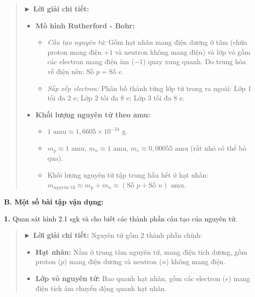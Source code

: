 \documentclass[11pt,a4paper]{article}
\begin{document}
\begin{quote}\small
{\color{myBlue}\textbf{► Lời giải chi tiết:}}
\begin{itemize}[leftmargin=*,itemsep=1pt,topsep=1pt]
  \item \textbf{Mô hình Rutherford - Bohr:}
    \begin{itemize}
      \item \textit{Cấu tạo nguyên tử:} Gồm hạt nhân mang điện dương ở tâm (chứa proton mang điện $+1$ và neutron không mang điện) và lớp vỏ gồm các electron mang điện âm ($-1$) quay xung quanh. Do trung hòa về điện nên: $\text{Số } p = \text{Số } e$.
      \item \textit{Sắp xếp electron:} Phân bố thành từng lớp từ trong ra ngoài: Lớp 1 tối đa $2\text{ e}$; Lớp 2 tối đa $8\text{ e}$; Lớp 3 tối đa $8\text{ e}$.
    \end{itemize}
  \item \textbf{Khối lượng nguyên tử theo amu:}
    \begin{itemize}
      \item $1\text{ amu} \approx 1{,}6605 \times 10^{-24}\text{ g}$.
      \item $m_p \approx 1\text{ amu}$, $m_n \approx 1\text{ amu}$, $m_e \approx 0{,}00055\text{ amu}$ (rất nhỏ có thể bỏ qua).
      \item Khối lượng nguyên tử tập trung hầu hết ở hạt nhân: $m_{\text{nguyên tử}} \approx m_p + m_n \approx (\text{Số } p + \text{Số } n)\text{ amu}$.
    \end{itemize}
\end{itemize}
\end{quote}

\vspace{4pt}
{\color{mySub}\textbf{B. Một số bài tập vận dụng:}}

\textbf{1.} Quan sát hình 2.1 sgk và cho biết các thành phần cấu tạo của nguyên tử.

\begin{quote}\small
{\color{myBlue}\textbf{► Lời giải chi tiết:}}
Nguyên tử gồm 2 thành phần chính:
\begin{itemize}[leftmargin=*,itemsep=1pt]
  \item \textbf{Hạt nhân:} Nằm ở trung tâm nguyên tử, mang điện tích dương, gồm proton ($p$) mang điện dương và neutron ($n$) không mang điện.
  \item \textbf{Lớp vỏ nguyên tử:} Bao quanh hạt nhân, gồm các electron ($e$) mang điện tích âm chuyển động quanh hạt nhân.
\end{itemize}
\end{quote}
\end{document}
